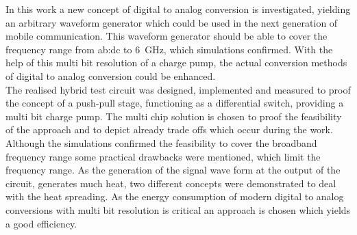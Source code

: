 In this work a new concept of digital to analog conversion is investigated, yielding an arbitrary waveform generator which could be used in the next generation of mobile communication. 
This waveform generator should be able to cover the frequency range from \gls{ab:dc} to \SI{6}{\giga \hertz}, which simulations confirmed.
With the help of this multi bit resolution of a charge pump, the actual conversion methods of digital to analog conversion could be enhanced.\\
The realised hybrid test circuit was designed, implemented and measured to proof the concept of a push-pull stage, functioning as a differential switch, providing a multi bit charge pump.
The multi chip solution is chosen to proof the feasibility of the approach and to depict already trade offs which occur during the work.\\
Although the simulations confirmed the feasibility to cover the broadband frequency range some practical drawbacks were mentioned, which limit the frequency range.
As the generation of the signal wave form at the output of the circuit, generates much heat, two different concepts were demonstrated to deal with the heat spreading.
As the energy consumption of modern digital to analog conversions with multi bit resolution is critical an approach is chosen which yields a good efficiency.



